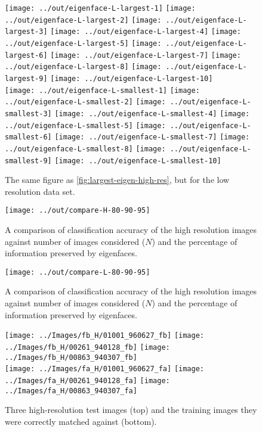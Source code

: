 \documentclass[headings=optiontoheadandtoc,listof=totoc,parskip=full]{scrartcl}
\begin{document}
\begin{figure}[H]
	\centering
	\texttt{[image: ../out/eigenface-L-largest-1]}
	\texttt{[image: ../out/eigenface-L-largest-2]}
	\texttt{[image: ../out/eigenface-L-largest-3]}
	\texttt{[image: ../out/eigenface-L-largest-4]}
	\texttt{[image: ../out/eigenface-L-largest-5]}
	\texttt{[image: ../out/eigenface-L-largest-6]}
	\texttt{[image: ../out/eigenface-L-largest-7]}
	\texttt{[image: ../out/eigenface-L-largest-8]}
	\texttt{[image: ../out/eigenface-L-largest-9]}
	\texttt{[image: ../out/eigenface-L-largest-10]}\\
	\texttt{[image: ../out/eigenface-L-smallest-1]}
	\texttt{[image: ../out/eigenface-L-smallest-2]}
	\texttt{[image: ../out/eigenface-L-smallest-3]}
	\texttt{[image: ../out/eigenface-L-smallest-4]}
	\texttt{[image: ../out/eigenface-L-smallest-5]}
	\texttt{[image: ../out/eigenface-L-smallest-6]}
	\texttt{[image: ../out/eigenface-L-smallest-7]}
	\texttt{[image: ../out/eigenface-L-smallest-8]}
	\texttt{[image: ../out/eigenface-L-smallest-9]}
	\texttt{[image: ../out/eigenface-L-smallest-10]}
	\caption{The same figure as \cref{fig:largest-eigen-high-res}, but for the low resolution data set.}
\end{figure}

\begin{figure}[H]
	\centering
	\texttt{[image: ../out/compare-H-80-90-95]}
	\caption{A comparison of classification accuracy of the high resolution images against number of images considered ($N$) and the percentage of information preserved by eigenfaces.}
\end{figure}

\begin{figure}[H]
	\centering
	\texttt{[image: ../out/compare-L-80-90-95]}
	\caption{A comparison of classification accuracy of the high resolution images against number of images considered ($N$) and the percentage of information preserved by eigenfaces.}
\end{figure}

\begin{figure}[H]
	\centering
	\texttt{[image: ../Images/fb\_H/01001\_960627\_fb]}
	\texttt{[image: ../Images/fb\_H/00261\_940128\_fb]}
	\texttt{[image: ../Images/fb\_H/00863\_940307\_fb]}\\
	\texttt{[image: ../Images/fa\_H/01001\_960627\_fa]}
	\texttt{[image: ../Images/fa\_H/00261\_940128\_fa]}
	\texttt{[image: ../Images/fa\_H/00863\_940307\_fa]}
	\caption{Three high-resolution test images (top) and the training images they were correctly matched against (bottom).}
\end{figure}
\end{document}
